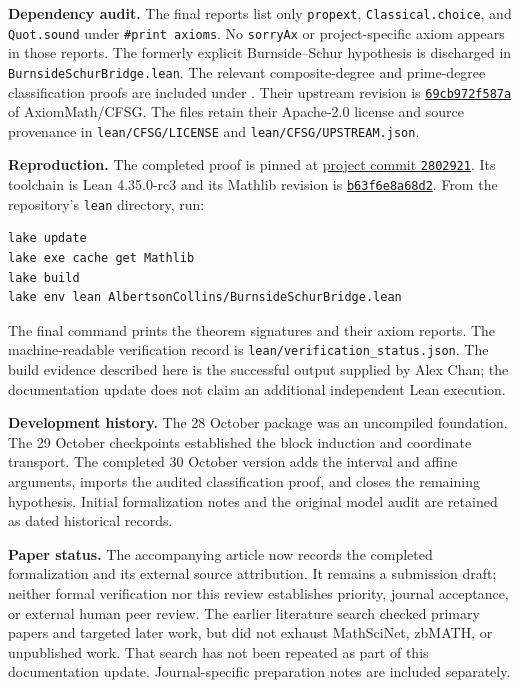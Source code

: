 \documentclass[11pt]{article}
\begin{document}
\textbf{Dependency audit.} The final reports list only
\texttt{propext}, \texttt{Classical.choice}, and \texttt{Quot.sound} under
\texttt{\#print axioms}. No \texttt{sorryAx} or project-specific axiom
appears in those reports. The formerly explicit Burnside--Schur
hypothesis is discharged in \texttt{BurnsideSchurBridge.lean}.
The relevant composite-degree and prime-degree classification proofs
are included under .
Their upstream revision is
\href{https://github.com/AxiomMath/CFSG/tree/69cb972f587a3ecc035e092253167ff2e303c962/CFSG/Permutation/BurnsideSchur}{\texttt{69cb972f587a}}
of AxiomMath/CFSG. The files retain their Apache-2.0 license and source
provenance in \texttt{lean/CFSG/LICENSE} and
\texttt{lean/CFSG/UPSTREAM.json}.

\textbf{Reproduction.} The completed proof is pinned at
\href{https://github.com/alexgocardinal/albertson-collins/tree/2802921/lean}{project commit \texttt{2802921}}.
Its toolchain is Lean 4.35.0-rc3 and its Mathlib revision is
\href{https://github.com/leanprover-community/mathlib4/tree/b63f6e8a68d220e3b3bc4f3792bb53650d375f24}{\texttt{b63f6e8a68d2}}.
From the repository's \texttt{lean} directory, run:
\begin{verbatim}
lake update
lake exe cache get Mathlib
lake build
lake env lean AlbertsonCollins/BurnsideSchurBridge.lean
\end{verbatim}
The final command prints the theorem signatures and their axiom reports.
The machine-readable verification record is
\texttt{lean/verification\_status.json}. The build evidence described
here is the successful output supplied by Alex Chan; the documentation
update does not claim an additional independent Lean execution.

\textbf{Development history.} The 28 October package was an uncompiled
foundation. The 29 October checkpoints established the block induction
and coordinate transport. The completed 30 October version adds the
interval and affine arguments, imports the audited classification proof,
and closes the remaining hypothesis. Initial formalization notes and the
original model audit are retained as dated historical records.

\textbf{Paper status.} The accompanying article now records the completed
formalization and its external source attribution. It remains a submission
draft; neither formal verification nor this review establishes priority,
journal acceptance, or external human peer review. The earlier literature
search checked primary papers and targeted later work, but did not exhaust
MathSciNet, zbMATH, or unpublished work. That search has not been repeated
as part of this documentation update. Journal-specific preparation notes
are included separately.
\end{document}

